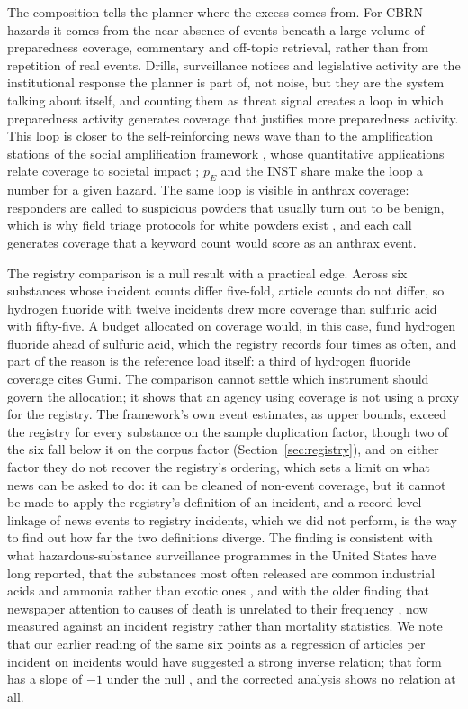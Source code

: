 \documentclass[1p,times]{elsarticle}
\begin{document}
The composition tells the planner where the excess comes from. For CBRN hazards it comes from the near-absence of events beneath a large volume of preparedness coverage, commentary and off-topic retrieval, rather than from repetition of real events. Drills, surveillance notices and legislative activity are the institutional response the planner is part of, not noise, but they are the system talking about itself, and counting them as threat signal creates a loop in which preparedness activity generates coverage that justifies more preparedness activity. This loop is closer to the self-reinforcing news wave \cite{vasterman2005,wien2009} than to the amplification stations of the social amplification framework \cite{kasperson1988,pidgeon2003,kasperson2022}, whose quantitative applications relate coverage to societal impact \cite{renn1992,burns1993}; $p_E$ and the INST share make the loop a number for a given hazard. The same loop is visible in anthrax coverage: responders are called to suspicious powders that usually turn out to be benign, which is why field triage protocols for white powders exist \cite{kim2026whitepowder}, and each call generates coverage that a keyword count would score as an anthrax event.

The registry comparison is a null result with a practical edge. Across six substances whose incident counts differ five-fold, article counts do not differ, so hydrogen fluoride with twelve incidents drew more coverage than sulfuric acid with fifty-five. A budget allocated on coverage would, in this case, fund hydrogen fluoride ahead of sulfuric acid, which the registry records four times as often, and part of the reason is the reference load itself: a third of hydrogen fluoride coverage cites Gumi. The comparison cannot settle which instrument should govern the allocation; it shows that an agency using coverage is not using a proxy for the registry. The framework's own event estimates, as upper bounds, exceed the registry for every substance on the sample duplication factor, though two of the six fall below it on the corpus factor (Section~\ref{sec:registry}), and on either factor they do not recover the registry's ordering, which sets a limit on what news can be asked to do: it can be cleaned of non-event coverage, but it cannot be made to apply the registry's definition of an incident, and a record-level linkage of news events to registry incidents, which we did not perform, is the way to find out how far the two definitions diverge. The finding is consistent with what hazardous-substance surveillance programmes in the United States have long reported, that the substances most often released are common industrial acids and ammonia rather than exotic ones \cite{horton2004,melnikova2020,eiffert2017,hu2004}, and with the older finding that newspaper attention to causes of death is unrelated to their frequency \cite{combs1979}, now measured against an incident registry rather than mortality statistics. We note that our earlier reading of the same six points as a regression of articles per incident on incidents would have suggested a strong inverse relation; that form has a slope of $-1$ under the null \cite{pearson1897}, and the corrected analysis shows no relation at all.
\end{document}
